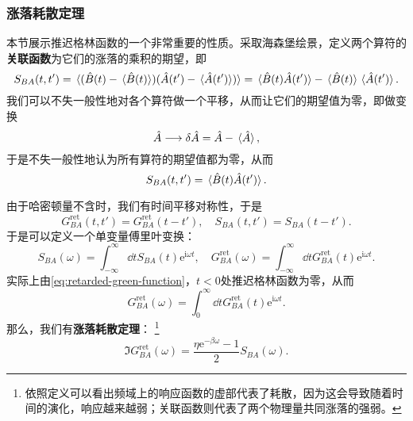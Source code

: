 \documentclass[hyperref, UTF8, a4paper]{ctexart}
\newcommand*{\ii}{\mathrm{i}}
\newcommand*{\ee}{\mathrm{e}}
\begin{document}
\subsubsection{涨落耗散定理}

本节展示推迟格林函数的一个非常重要的性质。采取海森堡绘景，定义两个算符的\textbf{关联函数}为它们的涨落的乘积的期望，即
\begin{equation}
    S_{BA}(t,t') = \expval*{(\hat{B}(t) - \expval*{\hat{B}(t)}) (\hat{A}(t') - \expval*{\hat{A}(t')})} = \expval*{\hat{B}(t)\hat{A}(t')} - \expval*{\hat{B}(t)}\expval*{\hat{A}(t')}.
\end{equation}
我们可以不失一般性地对各个算符做一个平移，从而让它们的期望值为零，即做变换
\[
    \hat{A} \longrightarrow \var{\hat{A}} = \hat{A} - \expval*{\hat{A}},
\]
于是不失一般性地认为所有算符的期望值都为零，从而
\begin{equation}
    S_{BA}(t,t') = \expval*{\hat{B}(t)\hat{A}(t')}.
\end{equation}

由于哈密顿量不含时，我们有时间平移对称性，于是
\begin{equation}
    G_{BA}^\text{ret}(t,t') = G_{BA}^\text{ret}(t-t'), \quad S_{BA}(t,t') = S_{BA}(t-t').
\end{equation}
于是可以定义一个单变量傅里叶变换：
\begin{equation}
    S_{BA}(\omega) = \int_{-\infty}^\infty \dd{t} S_{BA}(t) \ee^{\ii \omega t}, \quad G_{BA}^\text{ret}(\omega) = \int_{-\infty}^\infty \dd{t} G_{BA}^\text{ret}(t) \ee^{\ii \omega t}.
\end{equation}
实际上由\eqref{eq:retarded-green-function}，$t<0$处推迟格林函数为零，从而
\[
    G_{BA}^\text{ret}(\omega) = \int_0^\infty \dd{t} G_{BA}^\text{ret}(t) \ee^{\ii \omega t}.
\]
那么，我们有\textbf{涨落耗散定理}：%
\footnote{依照定义可以看出频域上的响应函数的虚部代表了耗散，因为这会导致随着时间的演化，响应越来越弱；关联函数则代表了两个物理量共同涨落的强弱。}
\begin{equation}
    \Im G_{BA}^\text{ret}(\omega) = \frac{\eta \ee^{-\beta \omega} - 1}{2} S_{BA}(\omega).
\end{equation}
\end{document}
